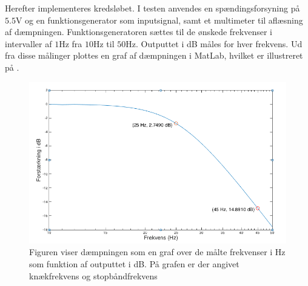 Herefter implementeres kredsløbet. I testen anvendes en spændingsforsyning på $5.5$V og en funktionsgenerator som inputsignal, samt et multimeter til aflæsning af dæmpningen. Funktionsgeneratoren sættes til de ønskede frekvenser i intervaller af $1$Hz fra $10$Hz til $50$Hz. Outputtet i dB måles for hver frekvens. Ud fra disse målinger plottes en graf af dæmpningen i MatLab, hvilket er illustreret på .  

\begin{figure}[H]
	\centering
	\includegraphics[scale=0.4]{figures/cProblemloesning/Lavpas_Matlab.PNG}
	\caption{Figuren viser dæmpningen som en graf over de målte frekvenser i Hz som funktion af outputtet i dB. På grafen er der angivet knækfrekvens og stopbåndfrekvens}
	\label{fig:Lavpas_Matlab}
\end{figure}



